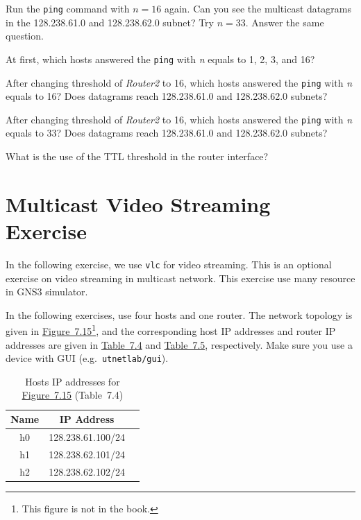 \documentclass{../UTNetLab}
\begin{document}
Run the \lstinline{ping} command with $n = 16$ again.
Can you see the multicast datagrams in the 128.238.61.0 and 128.238.62.0 subnet?
Try $n = 33$.
Answer the same question.

\begin{report}
    \item At first, which hosts answered the \lstinline{ping} with \textit{n} equals to 1, 2, 3, and 16?
    \item After changing threshold of \textit{Router2} to 16, which hosts answered the \lstinline{ping} with \textit{n} equals to 16?
    Does datagrams reach 128.238.61.0 and 128.238.62.0 subnets?
    \item After changing threshold of \textit{Router2} to 16, which hosts answered the \lstinline{ping} with \textit{n} equals to 33?
    Does datagrams reach 128.238.61.0 and 128.238.62.0 subnets?

    \item What is the use of the TTL threshold in the router interface?
\end{report}

\part{Multicast Video Streaming Exercise\label{sec:multicast-streaming}}
In the following exercise, we use \lstinline{vlc} for video streaming.
This is an optional exercise on video streaming in multicast network.
This exercise use many resource in GNS3 simulator.

In the following exercises, use four hosts and one router. The network topology is given in \hyperref[fig:7.15]{Figure~7.15}\footnote{This figure is not in the book.}, and the corresponding host IP addresses and router IP addresses are given in \hyperref[tab:7.4]{Table~7.4} and \hyperref[tab:7.5]{Table~7.5}, respectively.
Make sure you use a device with GUI (e.g.\ \texttt{utnetlab/gui}).

\begin{table}[H]
    \caption{Hosts IP addresses for \hyperref[fig:7.15]{Figure~7.15} (Table~7.4)}
    \label{tab:7.4}
    \centering
    \begin{tabular}{ *3c }
        \hline \hline
        Name & IP Address        \\
        \hline
        h0   & 128.238.61.100/24 \\
        h1   & 128.238.62.101/24 \\
        h2   & 128.238.62.102/24 \\
        \hline \hline
    \end{tabular}
\end{table}
\end{document}

